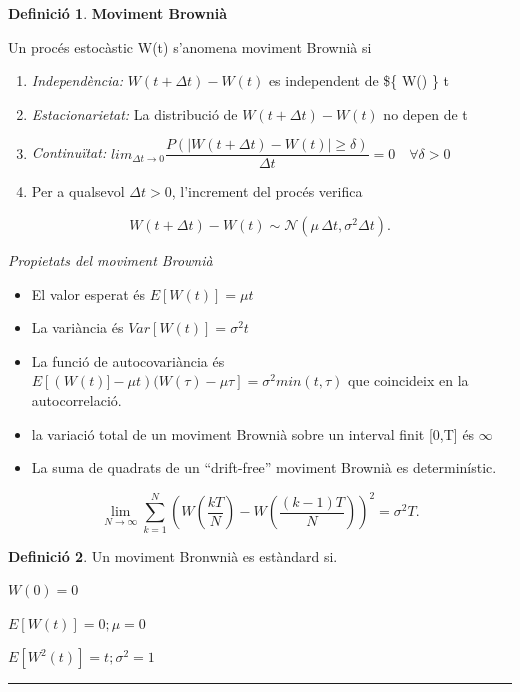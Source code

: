 \documentclass[
  catalan,
]{article}
\providecommand{\tightlist}{%
  \setlength{\itemsep}{0pt}\setlength{\parskip}{0pt}}
\theoremstyle{definition}
\newtheorem{definition}{Definició}[section]
\theoremstyle{definition}
\theoremstyle{definition}
\theoremstyle{definition}
\theoremstyle{remark}
\begin{document}
\begin{definition}
\textbf{Moviment Brownià}

Un procés estocàstic W(t) s'anomena moviment Brownià si

\begin{enumerate}
\def\labelenumi{\arabic{enumi}.}
\tightlist
\item
  \emph{Independència:} \(W(t+\Delta t)- W(t)\) es independent de \$\{ W(\tau) \} \quad  \forall \tau \leq t
\item
  \emph{Estacionarietat:} La distribució de \(W(t+\Delta t)-W(t)\) no depen de t
\item
  \emph{Continuïtat:} \(lim_{\Delta t \rightarrow 0} \dfrac {P(|W(t+\Delta t)- W(t)| \geq \delta)}{\Delta t}=0 \quad \forall \delta >0\)
\item
  Per a qualsevol \(\Delta t>0\), l'increment del procés verifica
\end{enumerate}

\[
W(t+\Delta t)-W(t)\sim \mathcal{N}\left(\mu\,\Delta t,\sigma^2\Delta t\right).
\]
\end{definition}

\emph{Propietats del moviment Brownià}

\begin{itemize}
\item
  El valor esperat és \(E[W(t)]=\mu t\)
\item
  La variància és \(Var[W(t)]=\sigma^2 t\)
\item
  La funció de autocovariància és \(E[(W(t)]-\mu t) (W(\tau)-\mu \tau]=\sigma^2 min(t,\tau)\) que coincideix en la autocorrelació.
\item
  la variació total de un moviment Brownià sobre un interval finit {[}0,T{]} és \(\infty\)
\item
  La suma de quadrats de un ``drift-free'' moviment Brownià es determinístic.
\end{itemize}

\[
\lim_{N \to \infty} \sum_{k=1}^{N} \left( W\left(\frac{kT}{N}\right) - W\left(\frac{(k-1)T}{N}\right) \right)^2=
\sigma^2 T.
\]

\begin{definition}
Un moviment Bronwnià es estàndard si.

\(W(0)=0\)

\(E[W(t)]=0 ; \mu=0\)

\(E[W^2(t)]=t ; \sigma^2=1\)
\end{definition}

\begin{center}\rule{0.5\linewidth}{0.5pt}\end{center}
\end{document}
